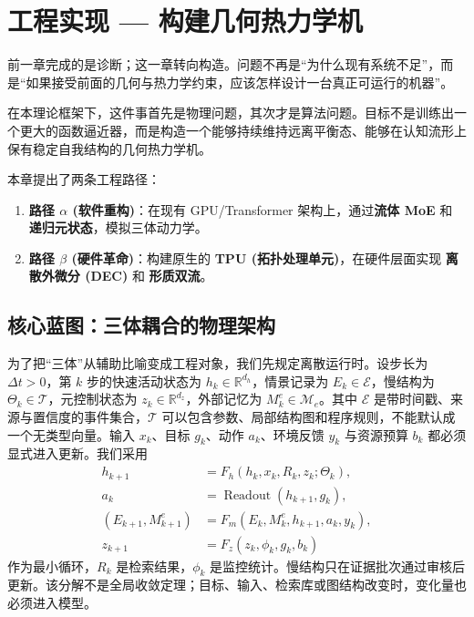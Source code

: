 \chapter{工程实现 — 构建几何热力学机}
\label{chp:engineering_implementation}

前一章完成的是诊断；这一章转向构造。问题不再是“为什么现有系统不足”，而是“如果接受前面的几何与热力学约束，应该怎样设计一台真正可运行的机器”。

在本理论框架下，这件事首先是物理问题，其次才是算法问题。目标不是训练出一个更大的函数逼近器，而是构造一个能够持续维持远离平衡态、能够在认知流形上保有稳定自我结构的几何热力学机。

本章提出了两条工程路径：
\begin{enumerate}
    \item \textbf{路径 $\alpha$ (软件重构)}：在现有 GPU/Transformer 架构上，通过\textbf{流体 MoE} 和 \textbf{递归元状态}，模拟三体动力学。
    \item \textbf{路径 $\beta$ (硬件革命)}：构建原生的 \textbf{TPU (拓扑处理单元)}，在硬件层面实现 \textbf{离散外微分 (DEC)} 和 \textbf{形质双流}。
\end{enumerate}


\section{核心蓝图：三体耦合的物理架构}
\label{sec:section_7895}

为了把“三体”从辅助比喻变成工程对象，我们先规定离散运行时。设步长为 $\Delta t>0$，第 $k$ 步的快速活动状态为 $h_k\in\mathbb{R}^{d_h}$，情景记录为 $E_k\in\mathcal{E}$，慢结构为 $\Theta_k\in\mathcal{T}$，元控制状态为 $z_k\in\mathbb{R}^{d_z}$，外部记忆为 $M^e_k\in\mathcal{M}_e$。其中 $\mathcal{E}$ 是带时间戳、来源与置信度的事件集合，$\mathcal{T}$ 可以包含参数、局部结构图和程序规则，不能默认成一个无类型向量。输入 $x_k$、目标 $g_k$、动作 $a_k$、环境反馈 $y_k$ 与资源预算 $b_k$ 都必须显式进入更新。我们采用
\begin{align}
h_{k+1}&=F_h(h_k,x_k,R_k,z_k;\Theta_k),\\
a_k&=\operatorname{Readout}(h_{k+1},g_k),\\
(E_{k+1},M^e_{k+1})&=F_m(E_k,M^e_k,h_{k+1},a_k,y_k),\\
z_{k+1}&=F_z(z_k,\phi_k,g_k,b_k)
\end{align}
作为最小循环，$R_k$ 是检索结果，$\phi_k$ 是监控统计。慢结构只在证据批次通过审核后更新。该分解不是全局收敛定理；目标、输入、检索库或图结构改变时，变化量也必须进入模型。

